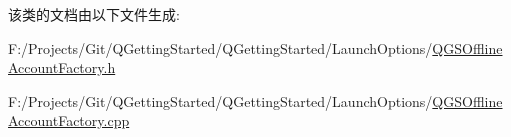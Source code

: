 该类的文档由以下文件生成\+:\begin{DoxyCompactItemize}
\item 
F\+:/\+Projects/\+Git/\+Q\+Getting\+Started/\+Q\+Getting\+Started/\+Launch\+Options/\mbox{\hyperlink{_q_g_s_offline_account_factory_8h}{Q\+G\+S\+Offline\+Account\+Factory.\+h}}\item 
F\+:/\+Projects/\+Git/\+Q\+Getting\+Started/\+Q\+Getting\+Started/\+Launch\+Options/\mbox{\hyperlink{_q_g_s_offline_account_factory_8cpp}{Q\+G\+S\+Offline\+Account\+Factory.\+cpp}}\end{DoxyCompactItemize}

